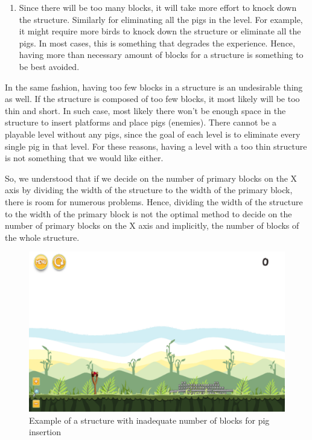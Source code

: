 \documentclass{dalthesis}
\begin{document}
\begin{enumerate}
\begin{enumerate}
    \item Since there will be too many blocks, it will take more effort to knock down the structure. Similarly for eliminating all the pigs in the level. For example, it might require more birds to knock down the structure or eliminate all the pigs. In most cases, this is something that degrades the experience. Hence, having more than necessary amount of blocks for a structure is something to be best avoided.
  \end{enumerate}

  In the same fashion, having too few blocks in a structure is an undesirable thing as well. If the structure is composed of too few blocks, it most likely will be too thin and short. In such case, most likely there won't be enough space in the structure to insert platforms and place pigs (enemies). There cannot be a playable level without any pigs, since the goal of each level is to eliminate every single pig in that level. For these reasons, having a level with a too thin structure is not something that we would like either.

  So, we understood that if we decide on the number of primary blocks on the X axis by dividing the width of the structure to the width of the primary block, there is room for numerous problems. Hence, dividing the width of the structure to the width of the primary block is not the optimal method to decide on the number of primary blocks on the X axis and implicitly, the number of blocks of the whole structure.

  \begin{figure}[h]
    \centering
    \caption{Example of a structure with inadequate number of blocks for pig insertion}
    \includegraphics[width=\textwidth,height=\textheight,keepaspectratio]{process/inadequete_number_of_blocks.png}
  \end{figure}


\end{enumerate}
\end{document}
